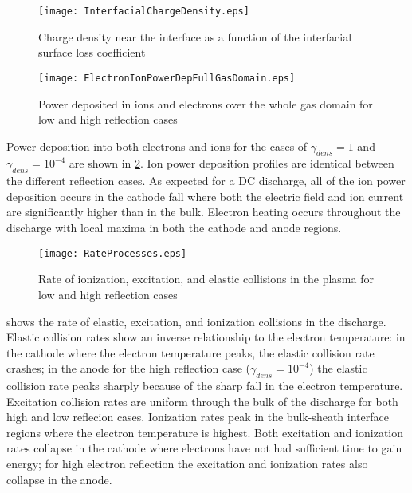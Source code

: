 \begin{figure}[htpb]
  \centering
  \texttt{[image: InterfacialChargeDensity.eps]}
  \caption{Charge density near the interface as a function of the interfacial surface loss coefficient}
  \label{fig:charge_dens_int}
\end{figure}

\begin{figure}[htpb]
  \centering
  \texttt{[image: ElectronIonPowerDepFullGasDomain.eps]}
  \caption{Power deposited in ions and electrons over the whole gas domain for low and high reflection cases}
  \label{fig:powerDep_em_Arp_full}
\end{figure}

Power deposition into both electrons and ions for the cases of $\gamma_{dens}=1$ and $\gamma_{dens}=10^{-4}$ are shown in \cref{fig:powerDep_em_Arp_full}. Ion power deposition profiles are identical between the different reflection cases. As expected for a DC discharge, all of the ion power deposition occurs in the cathode fall where both the electric field and ion current are significantly higher than in the bulk. Electron heating occurs throughout the discharge with local maxima in both the cathode and anode regions.

\begin{figure}[htpb]
  \centering
  \texttt{[image: RateProcesses.eps]}
  \caption{Rate of ionization, excitation, and elastic collisions in the plasma for low and high reflection cases}
  \label{fig:rateProc}
\end{figure}

 shows the rate of elastic, excitation, and ionization collisions in the discharge. Elastic collision rates show an inverse relationship to the electron temperature: in the cathode where the electron temperature peaks, the elastic collision rate crashes; in the anode for the high reflection case ($\gamma_{dens}=10^{-4}$) the elastic collision rate peaks sharply because of the sharp fall in the electron temperature. Excitation collision rates are uniform through the bulk of the discharge for both high and low reflecion cases. Ionization rates peak in the bulk-sheath interface regions where the electron temperature is highest. Both excitation and ionization rates collapse in the cathode where electrons have not had sufficient time to gain energy; for high electron reflection the excitation and ionization rates also collapse in the anode.

